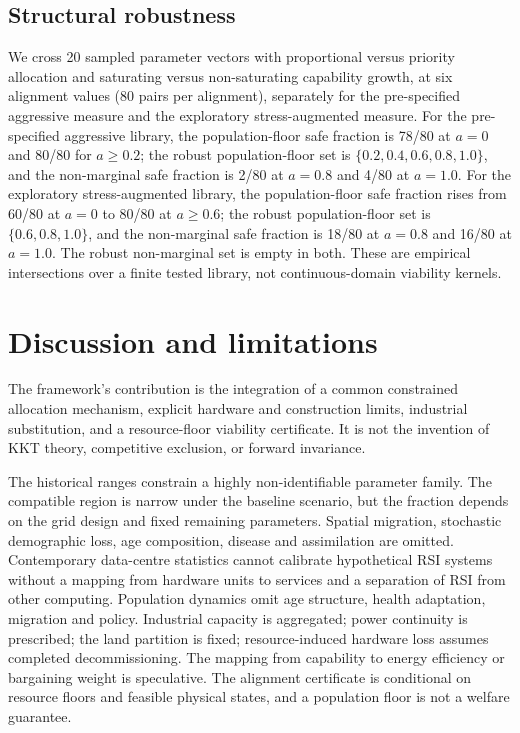 \documentclass[11pt]{article}
\begin{document}
\subsection{Structural robustness}
We cross 20 sampled parameter vectors with proportional versus priority allocation and saturating versus non-saturating capability growth, at six alignment values (80 pairs per alignment), separately for the pre-specified aggressive measure and the exploratory stress-augmented measure. For the pre-specified aggressive library, the population-floor safe fraction is 78/80 at $a=0$ and 80/80 for $a\ge0.2$; the robust population-floor set is $\{0.2,0.4,0.6,0.8,1.0\}$, and the non-marginal safe fraction is 2/80 at $a=0.8$ and 4/80 at $a=1.0$. For the exploratory stress-augmented library, the population-floor safe fraction rises from 60/80 at $a=0$ to 80/80 at $a\ge0.6$; the robust population-floor set is $\{0.6,0.8,1.0\}$, and the non-marginal safe fraction is 18/80 at $a=0.8$ and 16/80 at $a=1.0$. The robust non-marginal set is empty in both. These are empirical intersections over a finite tested library, not continuous-domain viability kernels.

\section{Discussion and limitations}

The framework's contribution is the integration of a common constrained allocation mechanism, explicit hardware and construction limits, industrial substitution, and a resource-floor viability certificate. It is not the invention of KKT theory, competitive exclusion, or forward invariance.

The historical ranges constrain a highly non-identifiable parameter family. The compatible region is narrow under the baseline scenario, but the fraction depends on the grid design and fixed remaining parameters. Spatial migration, stochastic demographic loss, age composition, disease and assimilation are omitted. Contemporary data-centre statistics cannot calibrate hypothetical RSI systems without a mapping from hardware units to services and a separation of RSI from other computing. Population dynamics omit age structure, health adaptation, migration and policy. Industrial capacity is aggregated; power continuity is prescribed; the land partition is fixed; resource-induced hardware loss assumes completed decommissioning. The mapping from capability to energy efficiency or bargaining weight is speculative. The alignment certificate is conditional on resource floors and feasible physical states, and a population floor is not a welfare guarantee.
\end{document}
